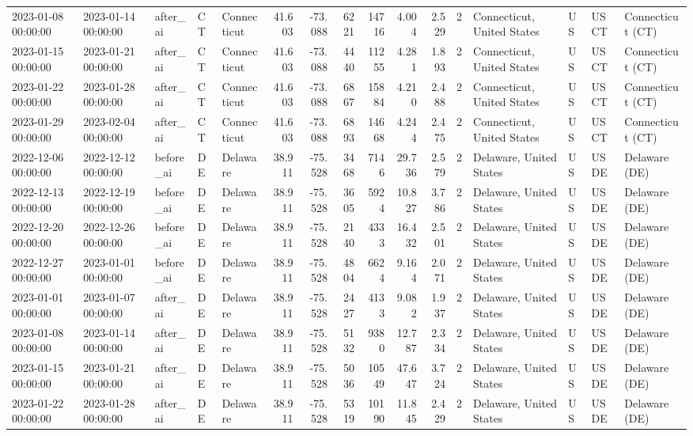 \begin{tabular}{lllllrrrrrrlllll}
2023-01-08 00:00:00 & 2023-01-14 00:00:00 & after\_ai & CT & Connecticut & 41.603 & -73.088 & 6221 & 14716 & 4.004 & 2.529 & 2 & Connecticut, United States & US & USCT & Connecticut (CT) \\
2023-01-15 00:00:00 & 2023-01-21 00:00:00 & after\_ai & CT & Connecticut & 41.603 & -73.088 & 4440 & 11255 & 4.281 & 1.893 & 2 & Connecticut, United States & US & USCT & Connecticut (CT) \\
2023-01-22 00:00:00 & 2023-01-28 00:00:00 & after\_ai & CT & Connecticut & 41.603 & -73.088 & 6867 & 15884 & 4.210 & 2.488 & 2 & Connecticut, United States & US & USCT & Connecticut (CT) \\
2023-01-29 00:00:00 & 2023-02-04 00:00:00 & after\_ai & CT & Connecticut & 41.603 & -73.088 & 6893 & 14668 & 4.244 & 2.475 & 2 & Connecticut, United States & US & USCT & Connecticut (CT) \\
2022-12-06 00:00:00 & 2022-12-12 00:00:00 & before\_ai & DE & Delaware & 38.911 & -75.528 & 3468 & 7146 & 29.736 & 2.579 & 2 & Delaware, United States & US & USDE & Delaware (DE) \\
2022-12-13 00:00:00 & 2022-12-19 00:00:00 & before\_ai & DE & Delaware & 38.911 & -75.528 & 3605 & 5924 & 10.827 & 3.786 & 2 & Delaware, United States & US & USDE & Delaware (DE) \\
2022-12-20 00:00:00 & 2022-12-26 00:00:00 & before\_ai & DE & Delaware & 38.911 & -75.528 & 2140 & 4333 & 16.432 & 2.501 & 2 & Delaware, United States & US & USDE & Delaware (DE) \\
2022-12-27 00:00:00 & 2023-01-01 00:00:00 & before\_ai & DE & Delaware & 38.911 & -75.528 & 4804 & 6624 & 9.164 & 2.071 & 2 & Delaware, United States & US & USDE & Delaware (DE) \\
2023-01-01 00:00:00 & 2023-01-07 00:00:00 & after\_ai & DE & Delaware & 38.911 & -75.528 & 2427 & 4133 & 9.082 & 1.937 & 2 & Delaware, United States & US & USDE & Delaware (DE) \\
2023-01-08 00:00:00 & 2023-01-14 00:00:00 & after\_ai & DE & Delaware & 38.911 & -75.528 & 5132 & 9380 & 12.787 & 2.334 & 2 & Delaware, United States & US & USDE & Delaware (DE) \\
2023-01-15 00:00:00 & 2023-01-21 00:00:00 & after\_ai & DE & Delaware & 38.911 & -75.528 & 5036 & 10549 & 47.647 & 3.724 & 2 & Delaware, United States & US & USDE & Delaware (DE) \\
2023-01-22 00:00:00 & 2023-01-28 00:00:00 & after\_ai & DE & Delaware & 38.911 & -75.528 & 5319 & 10190 & 11.845 & 2.429 & 2 & Delaware, United States & US & USDE & Delaware (DE) \\

\end{tabular}
